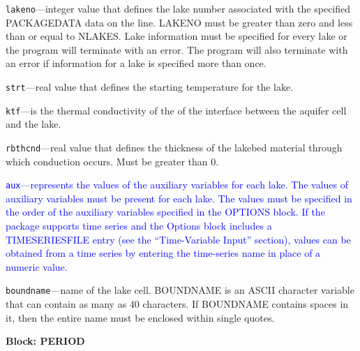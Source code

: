 \begin{description}
\item \texttt{lakeno}---integer value that defines the lake number associated with the specified PACKAGEDATA data on the line. LAKENO must be greater than zero and less than or equal to NLAKES. Lake information must be specified for every lake or the program will terminate with an error.  The program will also terminate with an error if information for a lake is specified more than once.

\item \texttt{strt}---real value that defines the starting temperature for the lake.

\item \texttt{ktf}---is the thermal conductivity of the of the interface between the aquifer cell and the lake.

\item \texttt{rbthcnd}---real value that defines the thickness of the lakebed material through which conduction occurs.  Must be greater than 0.

\item \textcolor{blue}{\texttt{aux}---represents the values of the auxiliary variables for each lake. The values of auxiliary variables must be present for each lake. The values must be specified in the order of the auxiliary variables specified in the OPTIONS block.  If the package supports time series and the Options block includes a TIMESERIESFILE entry (see the ``Time-Variable Input'' section), values can be obtained from a time series by entering the time-series name in place of a numeric value.}

\item \texttt{boundname}---name of the lake cell.  BOUNDNAME is an ASCII character variable that can contain as many as 40 characters.  If BOUNDNAME contains spaces in it, then the entire name must be enclosed within single quotes.

\end{description}
\item \textbf{Block: PERIOD}

